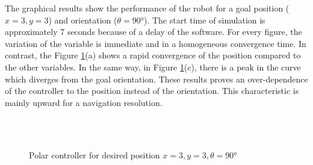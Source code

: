 \documentclass[conference]{IEEEtran}
\begin{document}
The graphical results show the performance of the robot for a goal position ($x = 3,y = 3$) and orientation ($\theta = 90°$). The start time of simulation is approximately 7 seconds because of a delay of the software. For every figure, the variation of the variable is immediate and in a homogeneous convergence time. In contrast, the Figure \ref{f:polar}(a) shows a rapid convergence of the position compared to the other variables. In the same way, in Figure \ref{f:polar}(c), there is a peak in the curve which diverges from the goal orientation. These results proves an over-dependence of the controller to the position instead of the orientation. This characteristic is mainly upward for a navigation resolution.

\begin{figure}
	\centering
	~\\
	~
	\caption{Polar controller for desired position $x=3, y=3, \theta=90°$} \label{f:polar}
\end{figure}
\end{document}

